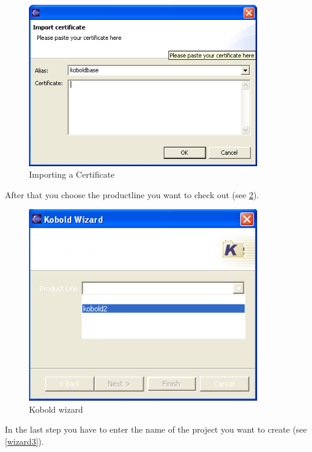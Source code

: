 \begin{figure}[h!]
\begin{center}
\includegraphics[width=10cm]{certificate.png}
   \caption{Importing a Certificate}
\label{certificate}
\end{center}
\end{figure}\par

After that you choose the productline you want to check out (see \ref{wizard2}).

\begin{figure}[h!]
\begin{center}
\includegraphics[width=10cm]{wizard2.png}
   \caption{Kobold wizard}
\label{wizard2}
\end{center}
\end{figure}\par

In the last step you have to enter the name of the project you want to create (see \ref{wizard3}).

